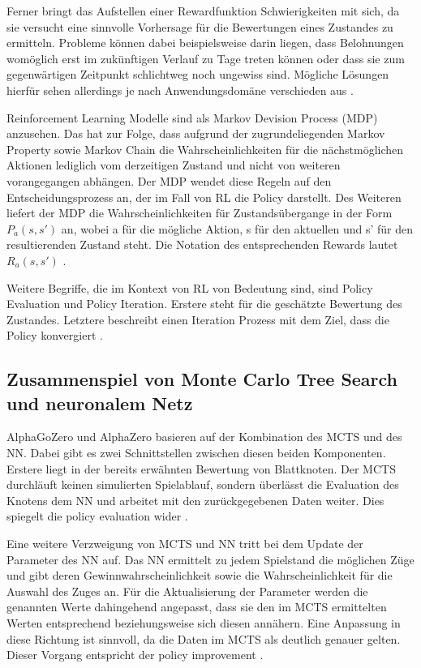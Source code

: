 \documentclass[12pt,a4paper]{article}
\begin{document}
Ferner bringt das Aufstellen einer Rewardfunktion Schwierigkeiten mit sich, da sie versucht eine sinnvolle Vorhersage für die Bewertungen eines Zustandes zu ermitteln. Probleme können dabei beispielsweise darin liegen, dass Belohnungen womöglich erst im zukünftigen Verlauf zu Tage treten können oder dass sie zum gegenwärtigen Zeitpunkt schlichtweg noch ungewiss sind. Mögliche Lösungen hierfür sehen allerdings je nach Anwendungsdomäne verschieden aus \cite[S. 4-7]{Sewak2019}.

Reinforcement Learning Modelle sind als \glqq{}Markov Devision Process\grqq{} (MDP) anzusehen. Das hat zur Folge, dass aufgrund der zugrundeliegenden \glqq{}Markov Property\grqq{} sowie \glqq{}Markov Chain\grqq{} die Wahrscheinlichkeiten für die nächstmöglichen Aktionen lediglich vom derzeitigen Zustand und nicht von weiteren vorangegangen abhängen. Der MDP wendet diese Regeln auf den Entscheidungsprozess an, der im Fall von RL die Policy darstellt. Des Weiteren liefert der MDP die Wahrscheinlichkeiten für Zustandsübergange in der Form $P_{a}(s, s')$ an, wobei a für die mögliche Aktion, s für den aktuellen und s' für den resultierenden Zustand steht. Die Notation des entsprechenden Rewards lautet $R_{a}(s, s')$ \cite[S. 19f.]{Sewak2019}.

Weitere Begriffe, die im Kontext von RL von Bedeutung sind, sind \glqq{}Policy Evaluation\grqq{} und \glqq{}Policy Iteration\grqq{}. Erstere steht für die geschätzte Bewertung des Zustandes. Letztere beschreibt einen Iteration Prozess mit dem Ziel, dass die Policy konvergiert \cite[S. 27]{Sewak2019}.

\subsection{Zusammenspiel von Monte Carlo Tree Search und neuronalem Netz}
AlphaGoZero und AlphaZero basieren auf der Kombination des MCTS und des NN. Dabei gibt es zwei Schnittstellen zwischen diesen beiden Komponenten. 
Erstere liegt in der bereits erwähnten Bewertung von Blattknoten. Der MCTS durchläuft keinen simulierten Spielablauf, sondern überlässt die Evaluation des Knotens dem NN und arbeitet mit den zurückgegebenen Daten weiter. Dies spiegelt die policy evaluation wider \cite{Silver2017}.

Eine weitere Verzweigung von MCTS und NN tritt bei dem Update der Parameter des NN auf. Das NN ermittelt zu jedem Spielstand die möglichen Züge und gibt deren Gewinnwahrscheinlichkeit sowie die Wahrscheinlichkeit für die Auswahl des Zuges an. Für die Aktualisierung der Parameter werden die genannten Werte dahingehend angepasst, dass sie den im MCTS ermittelten Werten entsprechend beziehungsweise sich diesen annähern. Eine Anpassung in diese Richtung ist sinnvoll, da die Daten im MCTS als deutlich genauer gelten. Dieser Vorgang entspricht der policy improvement \cite{Silver2017}.
\end{document}

